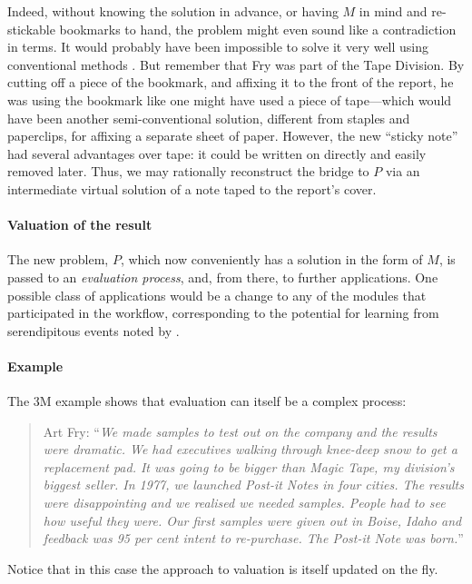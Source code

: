 Indeed, without knowing the solution in advance, or having $M$ in mind
and re-stickable bookmarks to hand, the problem might even sound like
a contradiction in terms.  It would probably have been impossible to
solve it very well using conventional methods
\cite[p.~90]{altshuller2007innovation}.  But remember that Fry was
part of the Tape Division.  By cutting off a piece of the bookmark,
and affixing it to the front of the report, he was using the bookmark
like one might have used a piece of tape---which would have been
another semi-conventional solution, different from staples and
paperclips, for affixing a separate sheet of paper.  However, the new
``sticky note'' had several advantages over tape: it could be written
on directly and easily removed later.  Thus, we may rationally
reconstruct the bridge to $P$ via an intermediate virtual solution of a note
taped to the report's cover.

\paragraph{Valuation of the result}
The new problem, $P$, which now conveniently has a solution in the
form of $M$, is passed to an \emph{evaluation process}, and, from
there, to further applications.  One possible class of applications
would be a change to any of the modules that participated in the
workflow, corresponding to the potential for learning from
serendipitous events noted by \citet{lawley2008maximising}.

\paragraph{\textbf{\upshape Example}}
The 3M example shows that evaluation can itself be a complex process:

\begin{quote}
Art Fry: ``\emph{We made samples to test out on the company and the
  results were dramatic.  We had executives walking through knee-deep
  snow to get a replacement pad.  It was going to be bigger than Magic
  Tape, my division’s biggest seller.  In 1977, we launched Post-it
  Notes in four cities.  The results were disappointing and we
  realised we needed samples.  People had to see how useful they
  were. Our first samples were given out in Boise, Idaho and feedback
  was 95 per cent intent to re-purchase.  The Post-it Note was
  born.}''
\end{quote}
Notice that in this case the approach to valuation is itself updated on the fly.

